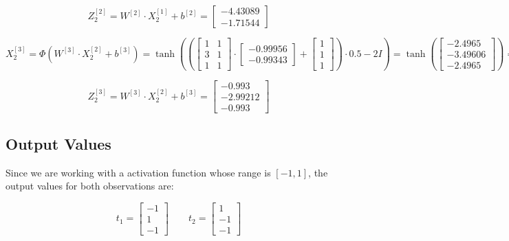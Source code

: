 \documentclass{article}
\begin{document}
\[ Z^{[2]}_2 = W^{[2]} \cdot X^{[1]}_2 + b^{[2]} = \begin{bmatrix} -4.43089 \\ -1.71544 \end{bmatrix} \]

\[ X^{[3]}_2 = \Phi(W^{[3]} \cdot X^{[2]}_2 + b^{[3]}) = \tanh \left( \left(\begin{bmatrix} 1 & 1  \\ 3 & 1 \\ 1 & 1 \end{bmatrix} \cdot \begin{bmatrix} -0.99956 \\ -0.99343 \end{bmatrix} + \begin{bmatrix} 1 \\ 1 \\ 1 \end{bmatrix} \right) \cdot 0.5 - 2I \right) = \tanh \left( \begin{bmatrix} -2.4965 \\ -3.49606 \\ -2.4965 \end{bmatrix} \right)  = \begin{bmatrix} -0.98652 \\ -0.99816 \\ -0.98652 \end{bmatrix} \]

\[ Z^{[3]}_2 = W^{[3]} \cdot X^{[2]}_2 + b^{[3]} = \begin{bmatrix} -0.993 \\ -2.99212 \\ -0.993 \end{bmatrix} \]

\subsection*{Output Values}

Since we are working with a activation function whose range is $[-1, 1]$, the output values for both observations are:

\[ t_1 = \begin{bmatrix} -1 \\ 1 \\ -1 \end{bmatrix} \qquad t_2 = \begin{bmatrix} 1 \\ -1 \\ -1 \end{bmatrix} \]
\end{document}
